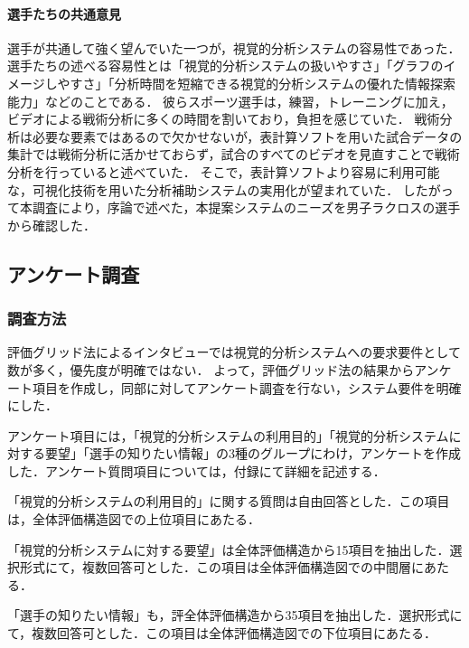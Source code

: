\documentclass[sotsuron]{kuee}
\begin{document}
				\paragraph{選手たちの共通意見}
					選手が共通して強く望んでいた一つが，視覚的分析システムの容易性であった．
					選手たちの述べる容易性とは「視覚的分析システムの扱いやすさ」「グラフのイメージしやすさ」「分析時間を短縮できる視覚的分析システムの優れた情報探索能力」などのことである．
					彼らスポーツ選手は，練習，トレーニングに加え，ビデオによる戦術分析に多くの時間を割いており，負担を感じていた．
					戦術分析は必要な要素ではあるので欠かせないが，表計算ソフトを用いた試合データの集計では戦術分析に活かせておらず，試合のすべてのビデオを見直すことで戦術分析を行っていると述べていた．
					そこで，表計算ソフトより容易に利用可能な，可視化技術を用いた分析補助システムの実用化が望まれていた．
					したがって本調査により，序論で述べた，本提案システムのニーズを男子ラクロスの選手から確認した．
		\subsection{アンケート調査}
			\subsubsection{調査方法}
				評価グリッド法によるインタビューでは視覚的分析システムへの要求要件として数が多く，優先度が明確ではない．
				よって，評価グリッド法の結果からアンケート項目を作成し，同部に対してアンケート調査を行ない，システム要件を明確にした．
				
				アンケート項目には，「視覚的分析システムの利用目的」「視覚的分析システムに対する要望」「選手の知りたい情報」の3種のグループにわけ，アンケートを作成した．アンケート質問項目については，付録にて詳細を記述する．

				「視覚的分析システムの利用目的」に関する質問は自由回答とした．この項目は，全体評価構造図での上位項目にあたる．

				「視覚的分析システムに対する要望」は全体評価構造から15項目を抽出した．選択形式にて，複数回答可とした．この項目は全体評価構造図での中間層にあたる．

				「選手の知りたい情報」も，評全体評価構造から35項目を抽出した．選択形式にて，複数回答可とした．この項目は全体評価構造図での下位項目にあたる．
\end{document}
